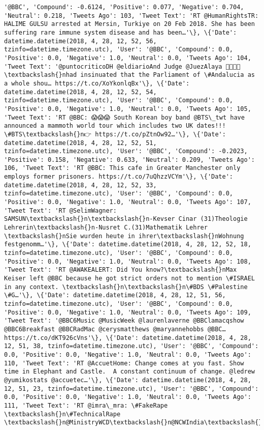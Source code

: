 \documentclass[11pt]{article}
\begin{document}
\begin{Verbatim}[commandchars=\\\{\}]
'@BBC', 'Compound': -0.6124, 'Positive': 0.077, 'Negative': 0.704, 'Neutral': 0.218, 'Tweets Ago': 103, 'Tweet Text': 'RT @HumanRightsTR: HALIME GULSU arrested at Mersin, Turkiye on 20 Feb 2018. She has been suffering rare immune system disease and has been…'\}, \{'Date': datetime.datetime(2018, 4, 28, 12, 52, 56, tzinfo=datetime.timezone.utc), 'User': '@BBC', 'Compound': 0.0, 'Positive': 0.0, 'Negative': 1.0, 'Neutral': 0.0, 'Tweets Ago': 104, 'Tweet Text': '@puntocriticoDH @eldiarioAnd Judge @JuezAlaya 👏👏👏👏\textbackslash{}nhad insinuated that the Parliament of \#Andalucia as a whole shou… https://t.co/XoYkonlqBx'\}, \{'Date': datetime.datetime(2018, 4, 28, 12, 52, 54, tzinfo=datetime.timezone.utc), 'User': '@BBC', 'Compound': 0.0, 'Positive': 0.0, 'Negative': 1.0, 'Neutral': 0.0, 'Tweets Ago': 105, 'Tweet Text': 'RT @BBC: 😱😱😱 South Korean boy band @BTS\_twt have announced a mammoth world tour which includes two UK dates!!! \#BTS\textbackslash{}n👉 https://t.co/pZtnOw92…'\}, \{'Date': datetime.datetime(2018, 4, 28, 12, 52, 51, tzinfo=datetime.timezone.utc), 'User': '@BBC', 'Compound': -0.2023, 'Positive': 0.158, 'Negative': 0.633, 'Neutral': 0.209, 'Tweets Ago': 106, 'Tweet Text': 'RT @BBC: This cafe in Greater Manchester only employs former prisoners. https://t.co/7uQhzzVCYm'\}, \{'Date': datetime.datetime(2018, 4, 28, 12, 52, 33, tzinfo=datetime.timezone.utc), 'User': '@BBC', 'Compound': 0.0, 'Positive': 0.0, 'Negative': 1.0, 'Neutral': 0.0, 'Tweets Ago': 107, 'Tweet Text': 'RT @SelimWagner: SAMSUN\textbackslash{}n\textbackslash{}n-Kevser Cinar (31)Theologie Lehrerin\textbackslash{}n-Nusret C.(31)Mathematik Lehrer \textbackslash{}nSie wurden heute in ihrer\textbackslash{}nWohnung festgenomm…'\}, \{'Date': datetime.datetime(2018, 4, 28, 12, 52, 18, tzinfo=datetime.timezone.utc), 'User': '@BBC', 'Compound': 0.0, 'Positive': 0.0, 'Negative': 1.0, 'Neutral': 0.0, 'Tweets Ago': 108, 'Tweet Text': 'RT @AWAKEALERT: Did You know?\textbackslash{}nMax Keiser left @BBC because he got strict orders not to mention \#ISRAEL in any context. \textbackslash{}n\textbackslash{}n\#BDS \#Palestine \#G…'\}, \{'Date': datetime.datetime(2018, 4, 28, 12, 51, 56, tzinfo=datetime.timezone.utc), 'User': '@BBC', 'Compound': 0.0, 'Positive': 0.0, 'Negative': 1.0, 'Neutral': 0.0, 'Tweets Ago': 109, 'Tweet Text': '@BBC6Music @MusicWeek @laurenlaverne @BBClamacqshow @BBC6Breakfast @BBCRadMac @cerysmatthews @maryannehobbs @BBC… https://t.co/dKT926cVns'\}, \{'Date': datetime.datetime(2018, 4, 28, 12, 51, 38, tzinfo=datetime.timezone.utc), 'User': '@BBC', 'Compound': 0.0, 'Positive': 0.0, 'Negative': 1.0, 'Neutral': 0.0, 'Tweets Ago': 110, 'Tweet Text': 'RT @AccuetHome: Change comes at you fast. Show time in Elephant and Castle.  A constant continuum of change. @ledrew @yumikostats @accuetec…'\}, \{'Date': datetime.datetime(2018, 4, 28, 12, 51, 23, tzinfo=datetime.timezone.utc), 'User': '@BBC', 'Compound': 0.0, 'Positive': 0.0, 'Negative': 1.0, 'Neutral': 0.0, 'Tweets Ago': 111, 'Tweet Text': 'RT @imra\_mra: \#FakeRape \textbackslash{}n\#TechnicalRape \textbackslash{}n@MinistryWCD\textbackslash{}n@NCWIndia\textbackslash{}n@rsprasad\textbackslash{}n\textbackslash{}n@HMOIndia\textbackslash{}n@PMOIndia\textbackslash{}n@CNN\textbackslash{}n@bbc 
\end{Verbatim}
\end{document}
